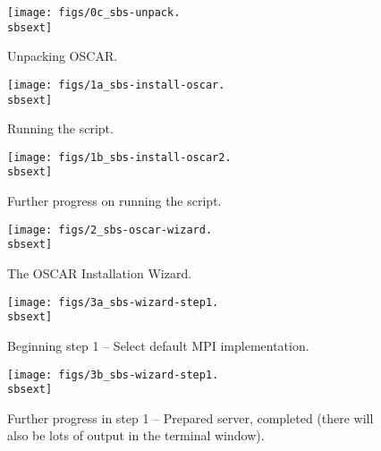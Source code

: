 \begin{figure}[htbp]
  \begin{center}
    \centerline{\texttt{[image: figs/0c\_sbs-unpack.\\sbsext]}}
    \caption{Unpacking OSCAR.}
    \label{fig:sbs-unpacking-oscar}
  \end{center}
\end{figure}


\begin{figure}[htbp]
  \begin{center}
    \centerline{\texttt{[image: figs/1a\_sbs-install-oscar.\\sbsext]}}
    \caption{Running the  script.}
    \label{fig:sbs-install-oscar}
  \end{center}
\end{figure}

\begin{figure}[htbp]
  \begin{center}
    \centerline{\texttt{[image: figs/1b\_sbs-install-oscar2.\\sbsext]}}
    \caption{Further progress on running the 
      script.}
    \label{fig:sbs-install-oscar2}
  \end{center}
\end{figure}


\begin{figure}[htbp]
  \begin{center}
    \centerline{\texttt{[image: figs/2\_sbs-oscar-wizard.\\sbsext]}}
    \caption{The OSCAR Installation Wizard.}
    \label{fig:sbs-install-wizard}
  \end{center}
\end{figure}




\begin{figure}[htbp]
  \begin{center}
    \centerline{\texttt{[image: figs/3a\_sbs-wizard-step1.\\sbsext]}}
    \caption{Beginning step 1 -- Select default MPI implementation.}
    \label{fig:sbs-install-wizard-s1}
  \end{center}
\end{figure}

\begin{figure}[htbp]
  \begin{center}
    \centerline{\texttt{[image: figs/3b\_sbs-wizard-step1.\\sbsext]}}
    \caption[Further progress in step 1 -- Prepared server,
    completed.]{Further progress in step 1 -- Prepared server,
      completed (there will also be lots of output in the terminal
      window).}
    \label{fig:sbs-install-wizard-s1b}
  \end{center}
\end{figure}


